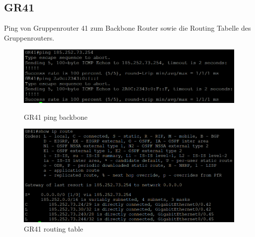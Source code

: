 \documentclass{article}
\begin{document}
\subsection{GR41}
Ping von Gruppenrouter 41 zum Backbone Router sowie die Routing Tabelle des Gruppenrouters.\\
\begin{figure}[!htp]
  \centering
  \begin{minipage}[b]{0.45\textwidth}
    \includegraphics[width=\textwidth]{Arbeitsergebnisse/GR41/gr41_ping_backbone.png}
    \caption{GR41 ping backbone}
  \end{minipage}
  \hspace{0.8cm}
  \begin{minipage}[b]{0.45\textwidth}
    \includegraphics[width=\textwidth]{Arbeitsergebnisse/GR41/gr41_routing_table.png}
    \caption{GR41 routing table}
  \end{minipage}
\end{figure}
\end{document}
